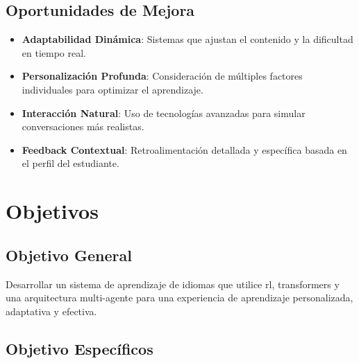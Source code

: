 \subsection{Oportunidades de Mejora}
\label{oportunidad-de-mejora}

\begin{itemize}
  \item \textbf{Adaptabilidad Dinámica}: Sistemas que ajustan el contenido y la dificultad en tiempo real.
  \item \textbf{Personalización Profunda}: Consideración de múltiples factores individuales para optimizar el aprendizaje.
  \item \textbf{Interacción Natural}: Uso de tecnologías avanzadas para simular conversaciones más realistas.
  \item \textbf{Feedback Contextual}: Retroalimentación detallada y específica basada en el perfil del estudiante.
\end{itemize}

\section{Objetivos}
\label{objetivos}

\subsection{Objetivo General}
\label{objetivo-general}

Desarrollar un sistema de aprendizaje de idiomas que utilice \gls{rl}, \gls{transformers} y una arquitectura multi-agente para una experiencia de aprendizaje personalizada, adaptativa y efectiva.

\subsection{Objetivo Específicos}
\label{objetivos-especificos}

